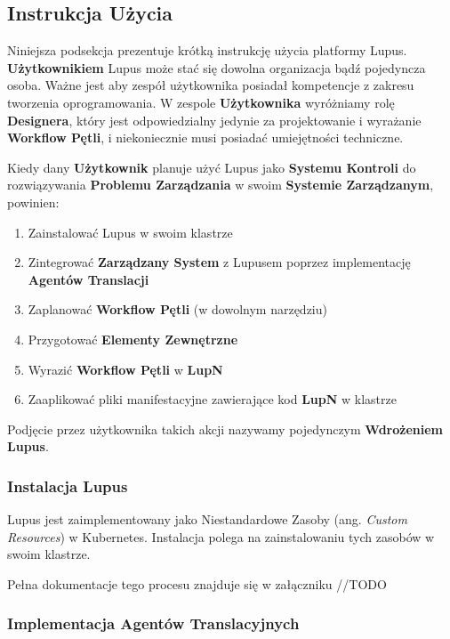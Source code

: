 \subsection{Instrukcja Użycia}

Niniejsza podsekcja prezentuje krótką instrukcję użycia platformy Lupus. \textbf{Użytkownikiem} Lupus może stać się dowolna organizacja bądź pojedyncza osoba. Ważne jest aby zespół użytkownika posiadał kompetencje z zakresu tworzenia oprogramowania. W zespole \textbf{Użytkownika} wyróżniamy rolę \textbf{Designera}, który jest odpowiedzialny jedynie za projektowanie i wyrażanie \textbf{Workflow Pętli}, i niekoniecznie musi posiadać umiejętności techniczne. 

Kiedy dany \textbf{Użytkownik} planuje użyć Lupus jako \textbf{Systemu Kontroli} do rozwiązywania \textbf{Problemu Zarządzania} w swoim \textbf{Systemie Zarządzanym}, powinien:
\begin{enumerate}
    \item Zainstalować Lupus w swoim klastrze
    \item Zintegrować \textbf{Zarządzany System} z Lupusem poprzez implementację \textbf{Agentów Translacji}
    \item Zaplanować \textbf{Workflow Pętli} (w dowolnym narzędziu)
    \item Przygotować \textbf{Elementy Zewnętrzne} 
    \item Wyrazić \textbf{Workflow Pętli} w \textbf{LupN} 
    \item Zaaplikować pliki manifestacyjne zawierające kod \textbf{LupN} w klastrze
\end{enumerate}

Podjęcie przez użytkownika takich akcji nazywamy pojedynczym \textbf{Wdrożeniem Lupus}.

\subsubsection{Instalacja Lupus}

Lupus jest zaimplementowany jako Niestandardowe Zasoby (ang. \textit{Custom Resources}) w Kubernetes. Instalacja polega na zainstalowaniu tych zasobów w swoim klastrze. 

Pełna dokumentacje tego procesu znajduje się w załączniku //TODO

\subsubsection{Implementacja Agentów Translacyjnych}

